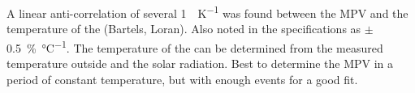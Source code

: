 A linear anti-correlation of several \SI{1}{\adc\per\kelvin} was found
between the MPV and the temperature of the \pmt (Bartels, Loran). Also
noted in the specifications as $\pm$
\SI{.5}{\percent\per\degreeCelsius}. The temperature of the \pmt can be
determined from the measured temperature outside and the solar
radiation. Best to determine the MPV in a period of constant
temperature, but with enough events for a good fit.

